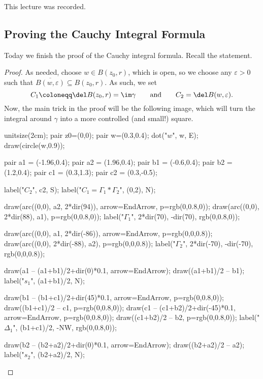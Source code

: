 
This lecture was recorded.

\subsection{Proving the Cauchy Integral Formula}
Today we finish the proof of the Cauchy integral formula. Recall the statement.
\thmcif*
\begin{proof}
	As needed, choose $w\in B(z_0,r)$, which is open, so we choose any $\varepsilon>0$ such that $\overline{B(w,\varepsilon)}\subseteq B(z_0,r)$. As such, we set
	\[C_1\coloneqq \del B(z_0,r)=\im\gamma\qquad\text{and}\qquad C_2=\del B(w,\varepsilon).\]
	Now, the main trick in the proof will be the following image, which will turn the integral around $\gamma$ into a more controlled (and small!) square.
	\begin{center}
		\begin{asy}
			unitsize(2cm);
			pair z0=(0,0);
			pair w=(0.3,0.4);
			dot("$w$", w, E);
			draw(circle(w,0.9));
			
			pair a1 = (-1.96,0.4);
			pair a2 = (1.96,0.4);
			pair b1 = (-0.6,0.4);
			pair b2 = (1.2,0.4);
			pair c1 = (0.3,1.3);
			pair c2 = (0.3,-0.5);
			
			label("$C_2$", c2, S);
			label("$C_1=\Gamma_1*\Gamma_2$", (0,2), N);
			
			draw(arc((0,0), a2, 2*dir(94)), arrow=EndArrow, p=rgb(0,0.8,0));
			draw(arc((0,0), 2*dir(88), a1), p=rgb(0,0.8,0));
			label("$\Gamma_1$", 2*dir(70), -dir(70), rgb(0,0.8,0));
			
			draw(arc((0,0), a1, 2*dir(-86)), arrow=EndArrow, p=rgb(0,0,0.8));
			draw(arc((0,0), 2*dir(-88), a2), p=rgb(0,0,0.8));
			label("$\Gamma_2$", 2*dir(-70), -dir(-70), rgb(0,0,0.8));
			
			draw(a1 -- (a1+b1)/2+dir(0)*0.1, arrow=EndArrow);
			draw((a1+b1)/2 -- b1);
			label("$s_1$", (a1+b1)/2, N);
			
			draw(b1 -- (b1+c1)/2+dir(45)*0.1, arrow=EndArrow, p=rgb(0,0.8,0));
			draw((b1+c1)/2 -- c1, p=rgb(0,0.8,0));
			draw(c1 -- (c1+b2)/2+dir(-45)*0.1, arrow=EndArrow, p=rgb(0,0.8,0));
			draw((c1+b2)/2 -- b2, p=rgb(0,0.8,0));
			label("$\Delta_1$", (b1+c1)/2, -NW, rgb(0,0.8,0));
			
			draw(b2 -- (b2+a2)/2+dir(0)*0.1, arrow=EndArrow);
			draw((b2+a2)/2 -- a2);
			label("$s_2$", (b2+a2)/2, N);
			

\end{asy}
\end{center}
\end{proof}

